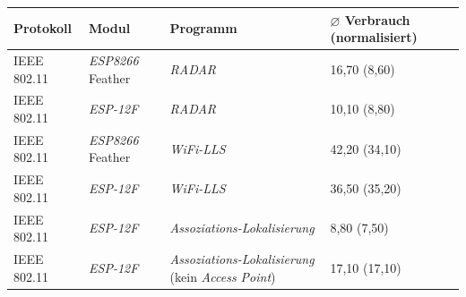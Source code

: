 \documentclass[18pt]{beamer}
\begin{document}
\begin{frame}
	\begin{tabular}{l|l|p{3.1cm}|R{2.1cm}}
		Protokoll & Modul & Programm  & $\varnothing$ Verbrauch (normalisiert)\\
		\hline
		IEEE 802.11 & \emph{ESP8266} Feather & \emph{RADAR} & 16,70 (8,60)\\
		IEEE 802.11 & \emph{ESP-12F} & \emph{RADAR} & 10,10 (8,80) \\
		\hline
		IEEE 802.11 & \emph{ESP8266} Feather & \emph{WiFi-LLS} & 42,20 (34,10)\\
		IEEE 802.11 & \emph{ESP-12F} & \emph{WiFi-LLS} & 36,50 (35,20)\\
		\hline
		IEEE 802.11 & \emph{ESP-12F} & \emph{Assoziations-Lokalisierung} & 8,80 (7,50)\\
		IEEE 802.11 & \emph{ESP-12F} & \emph{Assoziations-Lokalisierung} (kein \emph{Access Point}) & 17,10 (17,10)\\
	\end{tabular}
\end{frame}
\end{document}
